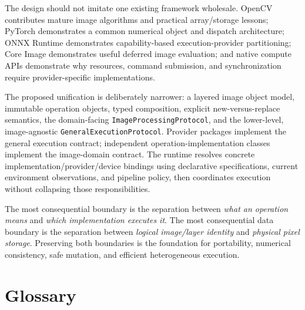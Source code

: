\documentclass[11pt,a4paper,oneside]{article}
\begin{document}
The design should not imitate one existing framework wholesale. OpenCV contributes mature image algorithms and practical array/storage lessons; PyTorch demonstrates a common numerical object and dispatch architecture; ONNX Runtime demonstrates capability-based execution-provider partitioning; Core Image demonstrates useful deferred image evaluation; and native compute APIs demonstrate why resources, command submission, and synchronization require provider-specific implementations.

The proposed unification is deliberately narrower: a layered image object model, immutable operation objects, typed composition, explicit new-versus-replace semantics, the domain-facing \texttt{ImageProcessing\allowbreak Protocol}, and the lower-level, image-agnostic \texttt{GeneralExecution\allowbreak Protocol}. Provider packages implement the general execution contract; independent operation-implementation classes implement the image-domain contract. The runtime resolves concrete implementation/provider/device bindings using declarative specifications, current environment observations, and pipeline policy, then coordinates execution without collapsing those responsibilities.

The most consequential boundary is the separation between \emph{what an operation means} and \emph{which implementation executes it}. The most consequential data boundary is the separation between \emph{logical image/layer identity} and \emph{physical pixel storage}. Preserving both boundaries is the foundation for portability, numerical consistency, safe mutation, and efficient heterogeneous execution.

\clearpage
\appendix
\section{Glossary}
\end{document}
